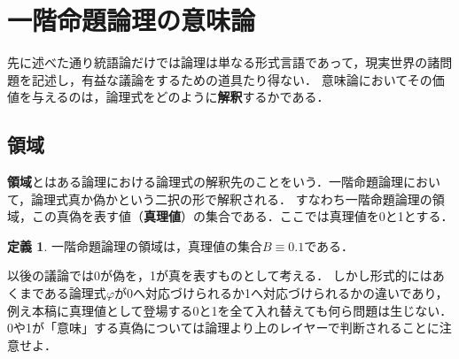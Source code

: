 \documentclass[uplatex,a4paper,dvipdfmx]{jsarticle}
\theoremstyle{definition}
\newtheorem{dfn}{定義}
\begin{document}
    \section{一階命題論理の意味論}
        先に述べた通り統語論だけでは論理は単なる形式言語であって，現実世界の諸問題を記述し，有益な議論をするための道具たり得ない．
        意味論においてその価値を与えるのは，論理式をどのように\textbf{解釈}するかである．

        \subsection{領域}
            \textbf{領域}とはある論理における論理式の解釈先のことをいう．一階命題論理において，論理式真か偽かという二択の形で解釈される．
            すなわち一階命題論理の領域，この真偽を表す値（\textbf{真理値}）の集合である．ここでは真理値を0と1とする．
            \begin{dfn}
                一階命題論理の領域は，真理値の集合$B \equiv \qty{0, 1}$である．
            \end{dfn}

            以後の議論では0が偽を，1が真を表すものとして考える．
            しかし形式的にはあくまである論理式$\varphi$が0へ対応づけられるか1へ対応づけられるかの違いであり，例え本稿に真理値として登場する0と1を全て入れ替えても何ら問題は生じない．
            0や1が「意味」する真偽については論理より上のレイヤーで判断されることに注意せよ．
\end{document}
